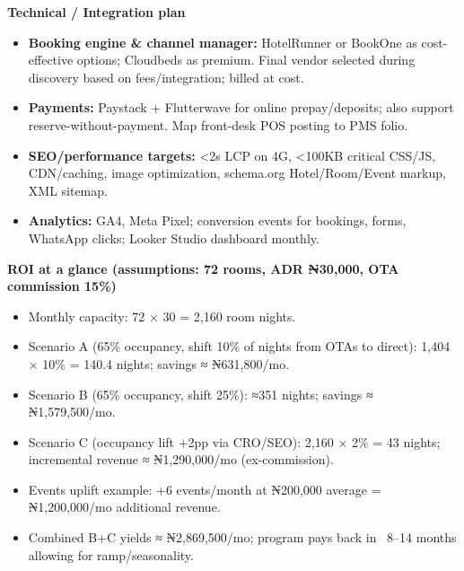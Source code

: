 \documentclass[11pt,a4paper]{article}
\begin{document}
\textbf{\color{wbBlue}Technical / Integration plan}
\begin{itemize}
  \item \textbf{Booking engine \& channel manager:} HotelRunner or BookOne as cost-effective options; Cloudbeds as premium. Final vendor selected during discovery based on fees/integration; billed at cost.
  \item \textbf{Payments:} Paystack + Flutterwave for online prepay/deposits; also support reserve-without-payment. Map front-desk POS posting to PMS folio.
  \item \textbf{SEO/performance targets:} <2s LCP on 4G, <100KB critical CSS/JS, CDN/caching, image optimization, schema.org Hotel/Room/Event markup, XML sitemap.
  \item \textbf{Analytics:} GA4, Meta Pixel; conversion events for bookings, forms, WhatsApp clicks; Looker Studio dashboard monthly.
\end{itemize}

\vspace{0.1em}
\textbf{\color{wbBlue}ROI at a glance (assumptions: 72 rooms, ADR ₦30,000, OTA commission 15\%)}
\begin{itemize}
  \item Monthly capacity: 72 × 30 = 2,160 room nights.
  \item Scenario A (65\% occupancy, shift 10\% of nights from OTAs to direct): 1,404 × 10\% = 140.4 nights; savings ≈ ₦631,800/mo.
  \item Scenario B (65\% occupancy, shift 25\%): ≈351 nights; savings ≈ ₦1,579,500/mo.
  \item Scenario C (occupancy lift +2pp via CRO/SEO): 2,160 × 2\% = 43 nights; incremental revenue ≈ ₦1,290,000/mo (ex-commission).
  \item Events uplift example: +6 events/month at ₦200,000 average = ₦1,200,000/mo additional revenue.
  \item Combined B+C yields ≈ ₦2,869,500/mo; program pays back in ~8–14 months allowing for ramp/seasonality.
\end{itemize}
\end{document}
